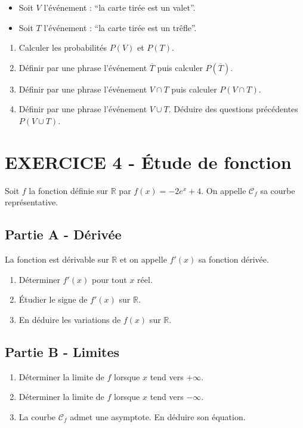 \documentclass[12pt]{article}
\begin{document}
\begin{itemize}
\item Soit $V$ l'événement : ``la carte tirée est un valet''.
\item Soit $T$ l'événement : ``la carte tirée est un trêfle''.
\end{itemize}

\begin{enumerate}
\item[1.] Calculer les probabilités $P(V)$ et $P(T)$.
\item[2.] Définir par une phrase l'événement $\overline{T}$ puis calculer $P(\overline{T})$. 
\item[3.] Définir par une phrase l'événement $V \cap T$ puis calculer $P(V \cap T)$. 
\item[4.] Définir par une phrase l'événement $V \cup T$. Déduire des questions précédentes $P(V \cup T)$. 
\end{enumerate}

\newpage
\section*{EXERCICE 4 - Étude de fonction} %

Soit $f$ la fonction définie sur $\mathbb{R}$ par $f(x) = -2e^{x} + 4$. On appelle $\mathcal{C}_f$ sa courbe représentative.

\setlength{\columnseprule}{1pt}
\begin{multicols}{2}

\subsection*{Partie A - Dérivée}

La fonction est dérivable sur $\mathbb{R}$ et on appelle $f'(x)$ sa fonction dérivée.

\begin{enumerate}
\item[1.] Déterminer $f'(x)$ pour tout $x$ réel.
\item[2.] Étudier le signe de $f'(x)$ sur $\mathbb{R}$.
\item[3.] En déduire les variations de $f(x)$ sur $\mathbb{R}$.
\end{enumerate}

\subsection*{Partie B - Limites}

\begin{enumerate}
\item[1.] Déterminer la limite de $f$ lorsque $x$ tend vers $+\infty.$
\item[2.] Déterminer la limite de $f$ lorsque $x$ tend vers $-\infty.$
\item[3.] La courbe $\mathcal{C}_f$ admet une asymptote. En déduire son équation.
\end{enumerate}

\end{multicols}
\end{document}
